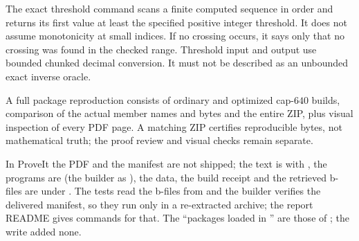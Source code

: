 The exact threshold command scans a finite computed sequence in order and returns its first value at least the specified positive integer threshold. It does not assume monotonicity at small indices. If no crossing occurs, it says only that no crossing was found in the checked range. Threshold input and output use bounded chunked decimal conversion. It must not be described as an unbounded exact inverse oracle.

A full package reproduction consists of ordinary and optimized cap-$640$ builds, comparison of the actual member names and bytes and the entire ZIP, plus visual inspection of every PDF page. A matching ZIP certifies reproducible bytes, not mathematical truth; the proof review and visual checks remain separate.
\begin{writenote}
In ProveIt the PDF and the manifest are not shipped; the text is
 with , the programs are
 (the builder as ), the data, the build
receipt and the retrieved b-files are under . The tests read the
b-files from  and the builder verifies the delivered manifest,
so they run only in a re-extracted archive; the report README gives commands
for that. The ``packages loaded in '' are those of
; the write added none.
\end{writenote}

